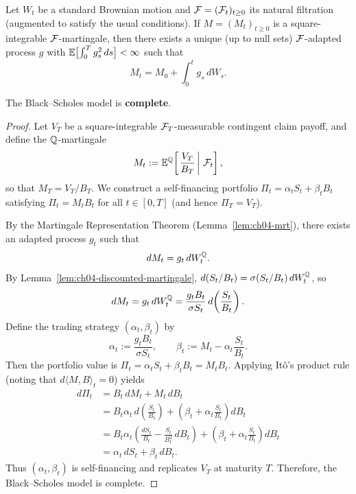 \begin{lemma}
    \label{lem:ch04-mrt}
    Let $W_t$ be a standard Brownian motion and $\mathcal{F} = (\mathcal{F}_t)_{t \ge 0}$ its natural filtration (augmented to satisfy the usual conditions). If $M = (M_t)_{t \ge 0}$ is a square-integrable $\mathcal{F}$-martingale, then there exists a unique (up to null sets) $\mathcal{F}$-adapted process $g$ with $\mathbb{E}\bigl[\int_0^T g_s^2\,ds\bigr] < \infty$ such that
    \[
        M_t = M_0 + \int_0^t g_s\,dW_s.
    \]
\end{lemma}

\begin{theorem}
    \label{thm:ch04-completeness}
    The Black--Scholes model is \textbf{complete}.
\end{theorem}
\begin{proof}
    Let $V_T$ be a square-integrable $\mathcal{F}_T$-measurable contingent claim payoff, and define the $\mathbb{Q}$-martingale
    \[
        M_t := \mathbb{E}^{\mathbb{Q}}\!\left[\left.\frac{V_T}{B_T}\,\right|\,\mathcal{F}_t\right],
    \]
    so that $M_T = V_T / B_T$. We construct a self-financing portfolio $\Pi_t = \alpha_t S_t + \beta_t B_t$ satisfying $\Pi_t = M_t B_t$ for all $t \in [0, T]$ (and hence $\Pi_T = V_T$).

    By the Martingale Representation Theorem (Lemma~\ref{lem:ch04-mrt}), there exists an adapted process $g_t$ such that
    \[
        dM_t = g_t\,dW_t^{\mathbb{Q}}.
    \]
    By Lemma~\ref{lem:ch04-discounted-martingale}, $d(S_t / B_t) = \sigma (S_t / B_t)\,dW_t^{\mathbb{Q}}$, so
    \[
        dM_t = g_t\,dW_t^{\mathbb{Q}} = \frac{g_t B_t}{\sigma S_t}\,d\!\left(\frac{S_t}{B_t}\right).
    \]
    Define the trading strategy $(\alpha_t, \beta_t)$ by
    \[
        \alpha_t := \frac{g_t B_t}{\sigma S_t}, \qquad \beta_t := M_t - \alpha_t \frac{S_t}{B_t}.
    \]
    Then the portfolio value is $\Pi_t = \alpha_t S_t + \beta_t B_t = M_t B_t$. Applying It\^o's product rule (noting that $d\langle M, B \rangle_t = 0$) yields
    \begin{align*}
        d\Pi_t &= B_t\,dM_t + M_t\,dB_t \\
        &= B_t \alpha_t\,d\!\left(\frac{S_t}{B_t}\right) + \left(\beta_t + \alpha_t \frac{S_t}{B_t}\right)dB_t \\
        &= B_t \alpha_t\left(\frac{dS_t}{B_t} - \frac{S_t}{B_t^2}\,dB_t\right) + \left(\beta_t + \alpha_t \frac{S_t}{B_t}\right)dB_t \\
        &= \alpha_t\,dS_t + \beta_t\,dB_t.
    \end{align*}
    Thus $(\alpha_t, \beta_t)$ is self-financing and replicates $V_T$ at maturity $T$. Therefore, the Black--Scholes model is complete.
\end{proof}

